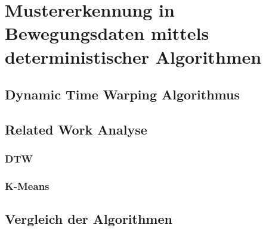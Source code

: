 \chapter{Mustererkennung in Bewegungsdaten mittels deterministischer Algorithmen}
\label{chapter2}


\section{Dynamic Time Warping Algorithmus}
\label{chapter2-DTW}


\section{Related Work Analyse}
\label{chapter2-RelatedWork}

\subsection{DTW}
\label{chapter2-RelatedWorkDTW}

\subsection{K-Means}
\label{chapter2-RelatedWorkKMeans}


\section{Vergleich der Algorithmen}
\label{chapter2-Vergleich}